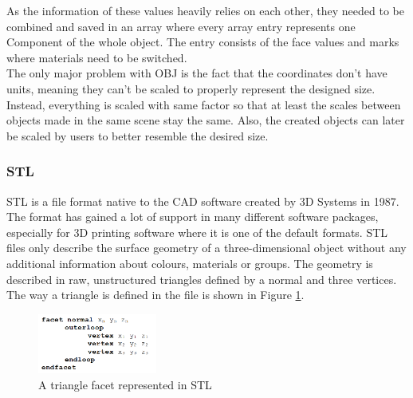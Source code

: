 \begin{table}[htbp]
	\centering 
	\caption[MTL Types]{Example types in MTL format}
	\label{tab:MTLTypes}
\end{table}

As the information of these values heavily relies on each other, they needed to be combined and saved in an array where every array entry represents one Component of the whole object. The entry consists of the face values and marks where materials need to be switched.\\
The only major problem with OBJ is the fact that the coordinates don't have units, meaning they can't be scaled to properly represent the designed size. Instead, everything is scaled with same factor so that at least the scales between objects made in the same scene stay the same. Also, the created objects can later be scaled by users to better resemble the desired size.

\subsubsection{STL}
STL is a file format native to the \acs{CAD} software created by 3D Systems in 1987\cite{bib:STL}. The format has gained a lot of support in many different software packages, especially for 3D printing software where it is one of the default formats. STL files only describe the surface geometry of a three-dimensional object without any additional information about colours, materials or groups. The geometry is described in raw, unstructured triangles defined by a normal and three vertices. The way a triangle is defined in the file is shown in Figure \ref{fig:STLFormat}. 
\begin{figure}[htpb]
	\centering
	\includegraphics[width=0.35\textwidth]{fig/STLFormat.png}
	\caption[STL Triangle facet]{A triangle facet represented in STL\protect}
	\label{fig:STLFormat}
\end{figure}

